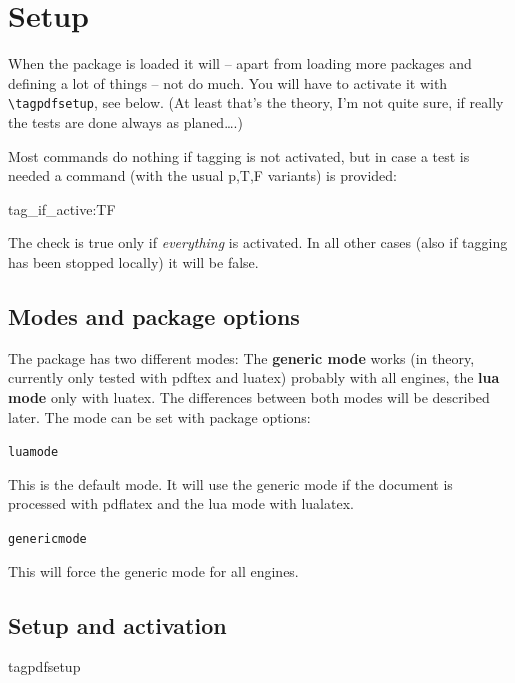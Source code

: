 \documentclass[DIV=12,parskip=half-,bibliography=totoc]{scrartcl}
\newcommand\DescribeKey[1]{\texttt{#1}}
\begin{document}
\tagpdfparaOn

\section{Setup}




When the package is loaded it will -- apart from loading more packages and defining a lot of things -- not do much. You will have to activate it with \verb+\tagpdfsetup+, see below. (At least that's the theory, I'm not quite sure, if really the tests are done always as planed\ldots.)

Most commands do nothing if tagging is not activated, but in case a test is needed a command (with the usual p,T,F variants) is provided:

\begin{docCommand}{tag_if_active:TF}{}\end{docCommand}

The check is true only if \emph{everything} is activated. In all other cases (also if tagging has been stopped locally) it will be false.

\subsection{Modes and package options}




The package has two different modes: The \textbf{generic mode} works (in theory, currently only tested with pdftex and luatex) probably with all engines, the \textbf{lua mode} only with luatex. The differences between both modes  will be described later. The mode can be set with package options:

\DescribeKey{luamode}

This is the default mode. It will use the generic mode if the document is processed with pdflatex and the lua mode with lualatex.

\DescribeKey{genericmode}

This will force the generic mode for all engines.


\subsection{Setup and activation}\label{ssec:setup}


\begin{docCommand}{tagpdfsetup}{}\end{docCommand}
\end{document}
